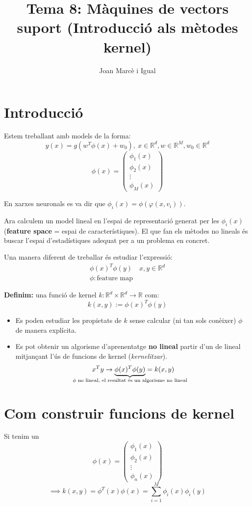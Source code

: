 \documentclass[a4paper]{article}
\title{Tema 8: Màquines de vectors suport (Introducció als mètodes kernel)}
\author{Joan Marcè i Igual}
\begin{document}
\section{Introducció}

Estem treballant amb models de la forma:
$$
y(x) = g(w^T\phi(x) + w_0),\ x \in \mathbb{R}^d, w \in \mathbb{R}^M, w_0 \in \mathbb{R}^d
$$
$$
\phi(x) =
\begin{pmatrix}
\phi_1(x) \\
\phi_2(x) \\
\vdots \\
\phi_M(x)
\end{pmatrix}
$$

En xarxes neuronals es va dir que $\phi_i(x) = \phi(\varphi(x, v_i))$. 

Ara calculem un model lineal en l'espai de representació generat per les $\phi_i(x)$ (\textbf{feature space} = espai de característiques). El que fan els mètodes no lineals és buscar l'espai d'estadístiques adequat per a un problema en concret.

Una manera diferent de treballar és estudiar l'expressió:
\begin{align*}
	\phi(x)^T\phi(y) \quad x,y \in \mathbb{R}^d \\
	\phi: \text{feature map} 
\end{align*}

\textbf{Definim:} una funció de kernel $k: \mathbb{R}^d \times \mathbb{R}^d \rightarrow \mathbb{R}$ com:
$$
k(x,y) := \phi(x)^T\phi(y)
$$

\begin{itemize}
	\item Es poden estudiar les propietats de $k$ sense calcular (ni tan sols conèixer) $\phi$ de manera explícita.
	\item Es pot obtenir un algorisme d'aprenentatge \textbf{no lineal} partir d'un de lineal mitjançant l'ús de funcions de kernel (\emph{kernelitzar}).
	$$
	x^Ty \rightarrow \underbrace{\phi(x)^T\phi(y)}_{\mathclap{\text{$\phi$ no lineal, el resultat és un algorisme no lineal}}} = k(x,y)
	$$
\end{itemize}

\section{Com construir funcions de kernel}
Si tenim un 
$$
\phi(x) = 
\begin{pmatrix}
\phi_1(x)\\
\phi_2(x) \\
\vdots \\
\phi_n(x)
\end{pmatrix}
$$
$$
\implies k(x,y) = \phi^T(x)\phi(x) = \sum_{i=1}^M \phi_i(x)\phi_i(y)
$$
\end{document}
